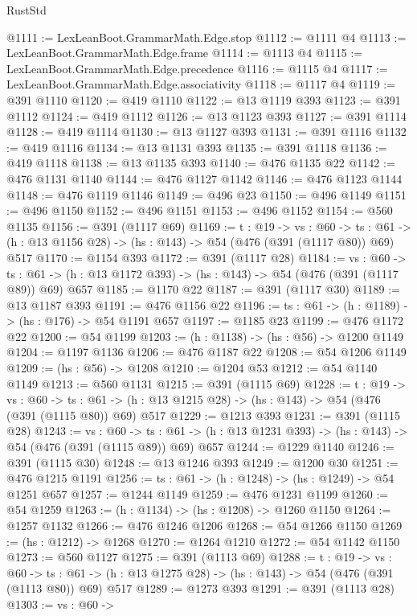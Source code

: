 \begin{lexlean}{RustStd}
\begin{coremodule}
@1111 := LexLeanBoot.GrammarMath.Edge.stop
@1112 := @1111 @4
@1113 := LexLeanBoot.GrammarMath.Edge.frame
@1114 := @1113 @4
@1115 := LexLeanBoot.GrammarMath.Edge.precedence
@1116 := @1115 @4
@1117 := LexLeanBoot.GrammarMath.Edge.associativity
@1118 := @1117 @4
@1119 := @391 @1110
@1120 := @419 @1110
@1122 := @13 @1119 @393
@1123 := @391 @1112
@1124 := @419 @1112
@1126 := @13 @1123 @393
@1127 := @391 @1114
@1128 := @419 @1114
@1130 := @13 @1127 @393
@1131 := @391 @1116
@1132 := @419 @1116
@1134 := @13 @1131 @393
@1135 := @391 @1118
@1136 := @419 @1118
@1138 := @13 @1135 @393
@1140 := @476 @1135 @22
@1142 := @476 @1131 @1140
@1144 := @476 @1127 @1142
@1146 := @476 @1123 @1144
@1148 := @476 @1119 @1146
@1149 := @496 @23
@1150 := @496 @1149
@1151 := @496 @1150
@1152 := @496 @1151
@1153 := @496 @1152
@1154 := @560 @1135
@1156 := @391 (@1117 @69)
@1169 := {t : @19} ->
  {vs : @60} ->
  {ts : @61} -> (h : @13 @1156 @28) -> (hs : @143) -> @54 (@476 (@391 (@1117 @80)) @69) @517
@1170 := @1154 @393
@1172 := @391 (@1117 @28)
@1184 := {vs : @60} ->
  {ts : @61} -> (h : @13 @1172 @393) -> (hs : @143) -> @54 (@476 (@391 (@1117 @89)) @69) @657
@1185 := @1170 @22
@1187 := @391 (@1117 @30)
@1189 := @13 @1187 @393
@1191 := @476 @1156 @22
@1196 := {ts : @61} -> (h : @1189) -> (hs : @176) -> @54 @1191 @657
@1197 := @1185 @23
@1199 := @476 @1172 @22
@1200 := @54 @1199
@1203 := (h : @1138) -> (hs : @56) -> @1200 @1149
@1204 := @1197 @1136
@1206 := @476 @1187 @22
@1208 := @54 @1206 @1149
@1209 := (hs : @56) -> @1208
@1210 := @1204 @53
@1212 := @54 @1140 @1149
@1213 := @560 @1131
@1215 := @391 (@1115 @69)
@1228 := {t : @19} ->
  {vs : @60} ->
  {ts : @61} -> (h : @13 @1215 @28) -> (hs : @143) -> @54 (@476 (@391 (@1115 @80)) @69) @517
@1229 := @1213 @393
@1231 := @391 (@1115 @28)
@1243 := {vs : @60} ->
  {ts : @61} -> (h : @13 @1231 @393) -> (hs : @143) -> @54 (@476 (@391 (@1115 @89)) @69) @657
@1244 := @1229 @1140
@1246 := @391 (@1115 @30)
@1248 := @13 @1246 @393
@1249 := @1200 @30
@1251 := @476 @1215 @1191
@1256 := {ts : @61} -> (h : @1248) -> (hs : @1249) -> @54 @1251 @657
@1257 := @1244 @1149
@1259 := @476 @1231 @1199
@1260 := @54 @1259
@1263 := (h : @1134) -> (hs : @1208) -> @1260 @1150
@1264 := @1257 @1132
@1266 := @476 @1246 @1206
@1268 := @54 @1266 @1150
@1269 := (hs : @1212) -> @1268
@1270 := @1264 @1210
@1272 := @54 @1142 @1150
@1273 := @560 @1127
@1275 := @391 (@1113 @69)
@1288 := {t : @19} ->
  {vs : @60} ->
  {ts : @61} -> (h : @13 @1275 @28) -> (hs : @143) -> @54 (@476 (@391 (@1113 @80)) @69) @517
@1289 := @1273 @393
@1291 := @391 (@1113 @28)
@1303 := {vs : @60} ->

\end{coremodule}
\end{lexlean}
